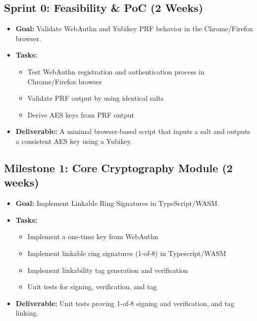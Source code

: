 \documentclass[letterpaper,11pt]{article}
\begin{document}
\subsection{Sprint 0: Feasibility \& PoC (2 Weeks)}
\begin{itemize}
    \item \textbf{Goal:} Validate WebAuthn and Yubikey PRF behavior in the Chrome/Firefox browser.
    \item \textbf{Tasks:}
    \begin{itemize}
        \item Test WebAuthn registration and authentication process in Chrome/Firefox browser
        \item Validate PRF output by using identical salts
        \item Derive AES keys from PRF output
    \end{itemize}
    \item \textbf{Deliverable:} A minimal browser-based script that inputs a salt and outputs a consistent AES key using a Yubikey.
\end{itemize}

\subsection{Milestone 1: Core Cryptography Module (2 weeks)}
\begin{itemize}
    \item \textbf{Goal:} Implement Linkable Ring Signatures in TypeScript/WASM.
    \item \textbf{Tasks:}
    \begin{itemize}
        \item Implement a one-time key from WebAuthn
        \item Implement linkable ring signatures (1-of-8) in Typescript/WASM
        \item Implement linkability tag generation and verification
        \item Unit tests for signing, verification, and tag
    \end{itemize}
    \item \textbf{Deliverable:} Unit tests proving 1-of-8 signing and verification, and tag linking.
\end{itemize}
\end{document}
